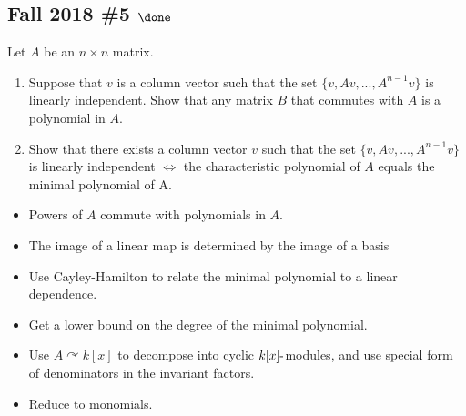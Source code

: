 \hypertarget{fall-2018-5-done}{%
\subsection{\texorpdfstring{Fall 2018 \#5
\(\done\)}{Fall 2018 \#5 \textbackslash done}}\label{fall-2018-5-done}}

Let \(A\) be an \(n \times n\) matrix.

\begin{enumerate}
\def\labelenumi{\alph{enumi}.}
\item
  Suppose that \(v\) is a column vector such that the set
  \(\{v, Av, . . . , A^{n-1} v\}\) is linearly independent. Show that
  any matrix \(B\) that commutes with \(A\) is a polynomial in \(A\).
\item
  Show that there exists a column vector \(v\) such that the set
  \(\{v, Av, . . . , A^{n-1} v\}\) is linearly independent \(\iff\) the
  characteristic polynomial of \(A\) equals the minimal polynomial of A.
\end{enumerate}

\begin{concept}

\envlist

\begin{itemize}
\tightlist
\item
  Powers of \(A\) commute with polynomials in \(A\).
\item
  The image of a linear map is determined by the image of a basis
\end{itemize}

\end{concept}

\begin{strategy}

\envlist

\begin{itemize}
\tightlist
\item
  Use Cayley-Hamilton to relate the minimal polynomial to a linear
  dependence.
\item
  Get a lower bound on the degree of the minimal polynomial.
\item
  Use \(A\curvearrowright k[x]\) to decompose into cyclic
  \(k[x]{\hbox{-}}\)modules, and use special form of denominators in the
  invariant factors.
\item
  Reduce to monomials.
\end{itemize}

\end{strategy}

